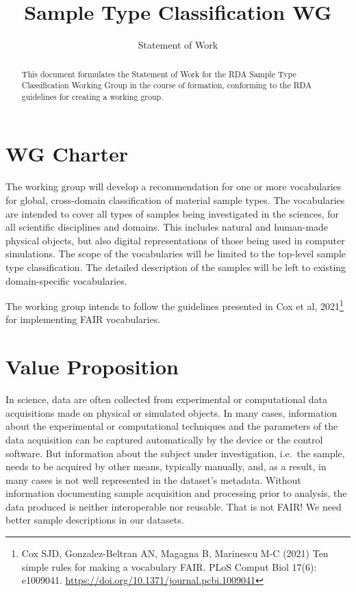\documentclass{scrartcl}
\begin{document}
\titlehead{\hfill\texttt{[image: rda-logo]}}
\title{Sample Type Classification WG}
\subtitle{Statement of Work}

\maketitle

\begin{abstract}\noindent
  This document formulates the Statement of Work for the RDA Sample
  Type Classification Working Group in the course of formation,
  conforming to the RDA guidelines for creating a working group.
\end{abstract}

\section{WG Charter}

The working group will develop a recommendation for one or more
vocabularies for global, cross-domain classification of material
sample types.  The vocabularies are intended to cover all types of
samples being investigated in the sciences, for all scientific
disciplines and domains.  This includes natural and human-made
physical objects, but also digital representations of those being used
in computer simulations.  The scope of the vocabularies will be
limited to the top-level sample type classification.  The detailed
description of the samples will be left to existing domain-specific
vocabularies.

The working group intends to follow the guidelines presented in Cox et
al, 2021\footnote{Cox SJD, Gonzalez-Beltran AN, Magagna B, Marinescu
  M-C (2021) Ten simple rules for making a vocabulary FAIR. PLoS
  Comput Biol 17(6): e1009041.
  \url{https://doi.org/10.1371/journal.pcbi.1009041}} for implementing
FAIR vocabularies.

\section{Value Proposition}

In science, data are often collected from experimental or
computational data acquisitions made on physical or simulated objects.
In many cases, information about the experimental or computational
techniques and the parameters of the data acquisition can be captured
automatically by the device or the control software.  But information
about the subject under investigation, i.e.\ the sample, needs to be
acquired by other means, typically manually, and, as a result, in many
cases is not well represented in the dataset’s metadata.  Without
information documenting sample acquisition and processing prior to
analysis, the data produced is neither interoperable nor reusable.
That is not FAIR!  We need better sample descriptions in our datasets.
\end{document}
